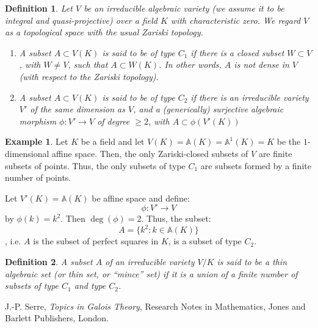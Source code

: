 \documentclass[12pt]{article}
\newtheorem{defn}{Definition}
\theoremstyle{definition}
\newtheorem*{exa}{Example}
\begin{document}
\begin{defn}
Let $V$ be an irreducible algebraic variety (we assume it to be integral and quasi-projective) over a field $K$ with characteristic zero. We regard $V$ as a topological space with the usual Zariski topology.
\begin{enumerate}
\item A subset $A\subset V(K)$ is said to be of type $C_1$ if there is a closed subset $W\subset V$, with $W\neq V$, such that $A\subset W(K)$. In other words, $A$ is not dense in $V$ (with respect to the Zariski topology).

\item A subset $A\subset V(K)$ is said to be of type $C_2$ if there is an irreducible variety $V'$ of the same dimension as $V$, and a (generically) surjective algebraic morphism $\phi\colon V'\to V$ of degree $\geq 2$, with $A\subset \phi(V'(K))$
\end{enumerate}
\end{defn}

\begin{exa}
Let $K$ be a field and let $V(K)=\mathbb{A}(K)=\mathbb{A}^1(K)=K$ be the $1$-dimensional affine space. Then, the only Zariski-closed subsets of $V$ are finite subsets of points. Thus, the only subsets of type $C_1$ are subsets formed by a finite number of points. 

Let $V'(K)=\mathbb{A}(K)$ be affine space and define:
$$\phi\colon V' \to V$$
by $\phi(k)=k^2$. Then $\deg(\phi)=2$. Thus, the subset:
$$A=\{k^2: k \in \mathbb{A}(K)\}$$
, i.e. $A$ is the subset of perfect squares in $K$, is a subset of type $C_2$.
\end{exa}

\begin{defn}
A subset $A$ of an irreducible variety $V/K$ is said to be a thin algebraic set (or thin set, or ``mince'' set) if it is a union of a finite number of subsets of type $C_1$ and type $C_2$.
\end{defn}

\begin{thebibliography}{9}
 J.-P. Serre, {\em Topics in Galois Theory},
Research Notes in Mathematics, Jones and Barlett Publishers, London.
\end{thebibliography}
\end{document}

